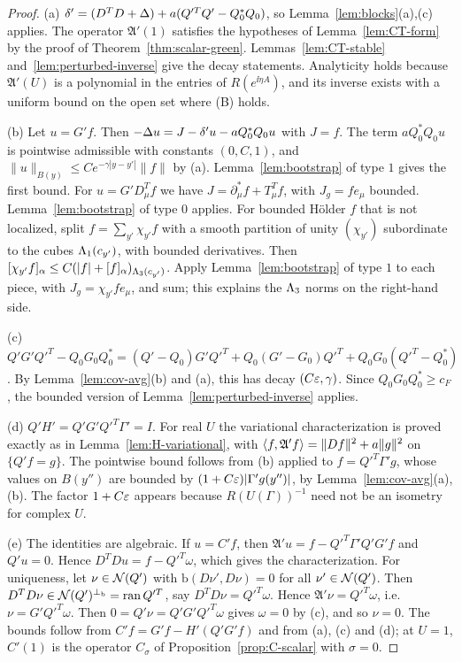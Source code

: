 \begin{proof}
(a) $\delta'=(D^TD+\Delta)+a(Q'^TQ'-Q_0^*Q_0)$, so Lemma~\ref{lem:blocks}(a),(c) applies. The operator $\mathfrak A'(1)$ satisfies the hypotheses of Lemma~\ref{lem:CT-form} by the proof of Theorem~\ref{thm:scalar-green}. Lemmas~\ref{lem:CT-stable} and~\ref{lem:perturbed-inverse} give the decay statements. Analyticity holds because $\mathfrak A'(U)$ is a polynomial in the entries of $R(e^{\ii\eta A})$, and its inverse exists with a uniform bound on the open set where (B) holds.

(b) Let $u=G'f$. Then $-\Delta u=J-\delta'u-aQ_0^*Q_0u$ with $J=f$. The term $aQ_0^*Q_0u$ is pointwise admissible with constants $(0,C,1)$, and $\|u\|_{B(y)}\le Ce^{-\gamma|y-y'|}\|f\|$ by (a). Lemma~\ref{lem:bootstrap} of type $1$ gives the first bound. For $u=G'D^T_\mu f$ we have $J=\partial^*_\mu f+T^T_\mu f$, with $J_g=fe_\mu$ bounded. Lemma~\ref{lem:bootstrap} of type $0$ applies. For bounded H\"older $f$ that is not localized, split $f=\sum_{y'}\chi_{y'}f$ with a smooth partition of unity $(\chi_{y'})$ subordinate to the cubes $\Lambda_1(c_{y'})$, with bounded derivatives. Then $[\chi_{y'}f]_\alpha\le C(|f|+[f]_\alpha)_{\Lambda_3(c_{y'})}$. Apply Lemma~\ref{lem:bootstrap} of type $1$ to each piece, with $J_g=\chi_{y'}fe_\mu$, and sum; this explains the $\Lambda_3$ norms on the right-hand side.

(c) $Q'G'Q'^T-Q_0G_0Q_0^*=(Q'-Q_0)G'Q'^T+Q_0(G'-G_0)Q'^T+Q_0G_0(Q'^T-Q_0^*)$. By Lemma~\ref{lem:cov-avg}(b) and (a), this has decay $(C\varepsilon,\gamma)$. Since $Q_0G_0Q_0^*\ge c_F$, the bounded version of Lemma~\ref{lem:perturbed-inverse} applies.

(d) $Q'H'=Q'G'Q'^T\Gamma'=I$. For real $U$ the variational characterization is proved exactly as in Lemma~\ref{lem:H-variational}, with $\langle f,\mathfrak A'f\rangle=\|Df\|^2+a\|g\|^2$ on $\{Q'f=g\}$. The pointwise bound follows from (b) applied to $f=Q'^T\Gamma'g$, whose values on $B(y'')$ are bounded by $(1+C\varepsilon)|\Gamma'g(y'')|$, by Lemma~\ref{lem:cov-avg}(a),(b). The factor $1+C\varepsilon$ appears because $R(U(\Gamma))^{-1}$ need not be an isometry for complex $U$.

(e) The identities are algebraic. If $u=C'f$, then $\mathfrak A'u=f-Q'^T\Gamma'Q'G'f$ and $Q'u=0$. Hence $D^TDu=f-Q'^T\omega$, which gives the characterization. For uniqueness, let $\nu\in\mathcal N(Q')$ with $\mathrm b(D\nu',D\nu)=0$ for all $\nu'\in\mathcal N(Q')$. Then $D^TD\nu\in\mathcal N(Q')^{\perp_{\mathrm b}}=\operatorname{ran} Q'^T$, say $D^TD\nu=Q'^T\omega$. Hence $\mathfrak A'\nu=Q'^T\omega$, i.e.\ $\nu=G'Q'^T\omega$. Then $0=Q'\nu=Q'G'Q'^T\omega$ gives $\omega=0$ by (c), and so $\nu=0$. The bounds follow from $C'f=G'f-H'(Q'G'f)$ and from (a), (c) and (d); at $U=1$, $C'(1)$ is the operator $C_\sigma$ of Proposition~\ref{prop:C-scalar} with $\sigma=0$.
\end{proof}

